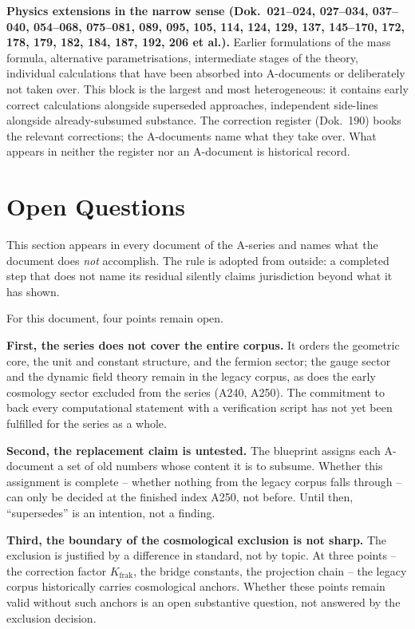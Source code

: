 \textbf{Physics extensions in the narrow sense (Dok.~021--024, 027--034,
037--040, 054--068, 075--081, 089, 095, 105, 114, 124, 129, 137, 145--170,
172, 178, 179, 182, 184, 187, 192, 206 et al.).} Earlier formulations of the mass
formula, alternative parametrisations, intermediate stages of the theory, individual
calculations that have been absorbed into A-documents or deliberately not taken over.
This block is the largest and most heterogeneous: it contains early correct
calculations alongside superseded approaches, independent side-lines alongside
already-subsumed substance. The correction register (Dok.~190) books the relevant
corrections; the A-documents name what they take over. What appears in neither the
register nor an A-document is historical record.


\section{Open Questions}

This section appears in every document of the A-series and names what the
document does \emph{not} accomplish. The rule is adopted from outside: a
completed step that does not name its residual silently claims jurisdiction
beyond what it has shown.

For this document, four points remain open.

\textbf{First, the series does not cover the entire corpus.} It orders the
geometric core, the unit and constant structure, and the fermion sector;
the gauge sector and the dynamic field theory remain in the legacy corpus,
as does the early cosmology sector excluded from the series (A240, A250).
The commitment to back every computational statement with a verification
script has not yet been fulfilled for the series as a whole.

\textbf{Second, the replacement claim is untested.} The blueprint assigns
each A-document a set of old numbers whose content it is to subsume. Whether
this assignment is complete -- whether nothing from the legacy corpus falls
through -- can only be decided at the finished index A250, not before. Until
then, ``supersedes'' is an intention, not a finding.

\textbf{Third, the boundary of the cosmological exclusion is not sharp.} The
exclusion is justified by a difference in standard, not by topic. At three
points -- the correction factor $K_\text{frak}$, the bridge constants, the
projection chain -- the legacy corpus historically carries cosmological
anchors. Whether these points remain valid without such anchors is an open
substantive question, not answered by the exclusion decision.

